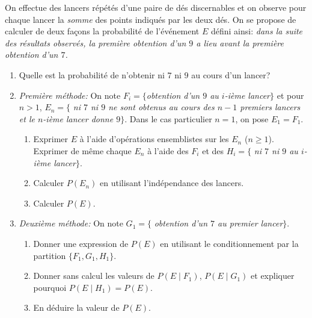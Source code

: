 \documentclass[a4paper,12pt,reqno]{amsart}
\begin{document}
\begin{exo}

  On effectue des lancers répétés d'une paire de dés discernables et on observe pour
  chaque lancer la \emph{somme} des points indiqués par les deux dés. On se
  propose de calculer de deux façons la probabilité de l'événement $E$ défini
  ainsi: \emph{dans la suite des résultats observés, la première obtention d'un
  $9$ a lieu avant la première obtention d'un $7$.}

  \begin{enumerate}
    \item  Quelle est la probabilité de n'obtenir ni $7$ ni $9$ au cours d'un lancer?
    \item \emph{Première méthode:} On note $F_i=\{$\emph{obtention d'un $9$ au $i$-ième lancer}$\}$ et pour $n>1$, $E_n=\{$ \emph{ni $7$ ni $9$ ne sont obtenus au cours des $n-1$ premiers lancers et le $n$-ième lancer donne $9$}$\}$. Dans le cas particulier $n=1$, on pose $E_1=F_1$.
      \begin{enumerate}
        \item Exprimer $E$ à l'aide d'opérations ensemblistes sur les $E_n$ ($n\geq 1$). Exprimer de même chaque $E_n$ à l'aide  des $F_i$ et des  $H_i=\{$ \emph{ni $7$ ni $9$ au $i$-ième lancer}$\}$.
        \item Calculer $P(E_n)$ en utilisant l'indépendance des lancers.
        \item Calculer $P(E)$.
      \end{enumerate}
    \item \emph{Deuxième méthode:}  On note $G_1=\{$ \emph{obtention d'un $7$ au premier lancer}$\}$.
      \begin{enumerate}
        \item Donner une expression de $P(E)$ en utilisant le conditionnement par la partition $\{F_1,G_1,H_1\}$.
        \item Donner sans calcul les valeurs de $P(E\mid F_1)$, $P(E\mid G_1)$ et expliquer pourquoi $P(E\mid H_1)=P(E)$.
        \item En déduire la valeur de $P(E)$.
      \end{enumerate}
  \end{enumerate}

\end{exo}
\end{document}
